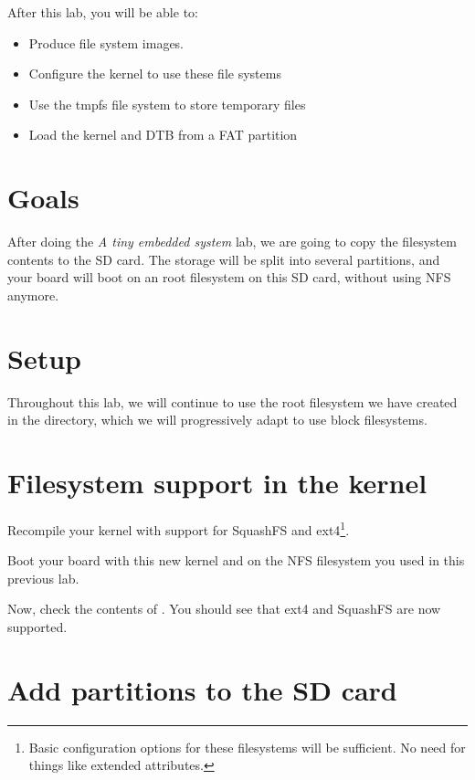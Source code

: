 
After this lab, you will be able to:
\begin{itemize}
\item Produce file system images.
\item Configure the kernel to use these file systems
\item Use the tmpfs file system to store temporary files
\item Load the kernel and DTB from a FAT partition
\end{itemize}

\section{Goals}

After doing the {\em A tiny embedded system} lab, we are going to copy
the filesystem contents to the SD card. The storage will be
split into several partitions, and your board will boot
on an root filesystem on this SD card, without using NFS anymore.

\section{Setup}

Throughout this lab, we will continue to use the root filesystem we
have created in the 
directory, which we will progressively adapt to use block filesystems.

\section{Filesystem support in the kernel}

Recompile your kernel with support for SquashFS and ext4\footnote{Basic
configuration options for these filesystems will be sufficient. No need
for things like extended attributes.}.

Boot your board with this new kernel and on the NFS filesystem you
used in this previous lab.

Now, check the contents of . You should see
 that ext4 and SquashFS are now supported.

\section{Add partitions to the SD card}

